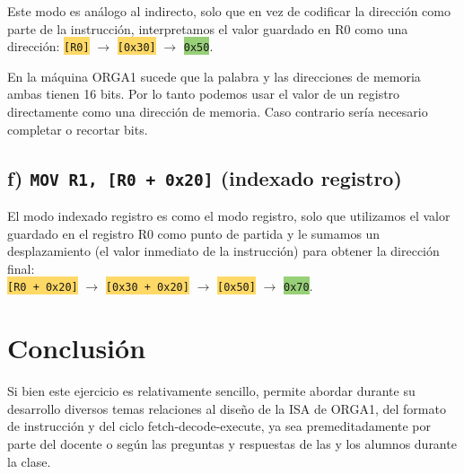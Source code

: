 

Este modo es análogo al indirecto, solo que en vez de codificar la dirección como parte de la instrucción, interpretamos el valor guardado en R0 como una dirección: \colorbox[HTML]{FFD966}{\lstinline{[R0]}} $\to$ \colorbox[HTML]{FFD966}{\lstinline{[0x30]}} $\to$ \colorbox[HTML]{97D077}{\lstinline{0x50}}.


En la máquina ORGA1 sucede que la palabra y las direcciones de memoria ambas tienen 16 bits. Por lo tanto podemos usar el valor de un registro directamente como una dirección de memoria. Caso contrario sería necesario completar o recortar bits.


\subsection*{f) \lstinline{MOV R1, [R0 + 0x20]} (indexado registro)}



El modo indexado registro es como el modo registro, solo que utilizamos el valor guardado en el registro R0 como punto de partida y le sumamos un desplazamiento (el valor inmediato de la instrucción) para obtener la dirección final: \\
\colorbox[HTML]{FFD966}{\lstinline{[R0 + 0x20]}} $\to$ \colorbox[HTML]{FFD966}{\lstinline{[0x30 + 0x20]}} $\to$ \colorbox[HTML]{FFD966}{\lstinline{[0x50]}} $\to$ \colorbox[HTML]{97D077}{\lstinline{0x70}}.


\section*{Conclusión}

Si bien este ejercicio es relativamente sencillo, permite abordar durante su desarrollo diversos temas relaciones al diseño de la ISA de ORGA1, del formato de instrucción y del ciclo fetch-decode-execute, ya sea premeditadamente por parte del docente o según las preguntas y respuestas de las y los alumnos durante la clase.


